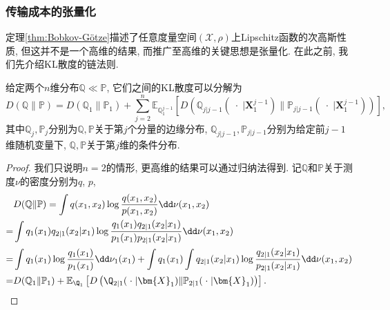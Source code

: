 \subsubsection{传输成本的张量化}
定理\ref{thm:Bobkov-Götze}描述了任意度量空间$(\mathcal{X}, \rho)$上Lipschitz函数的次高斯性质, 但这并不是一个高维的结果, 而推广至高维的关键思想是张量化. 
在此之前, 我们先介绍KL散度的链法则. 
\begin{lemma}\label{lemma:ChainRuleForKLDivergence}
	给定两个$n$维分布$\mathbb{Q} \ll \mathbb{P}$, 它们之间的KL散度可以分解为
	\begin{equation*}
		D(\mathbb{Q} \| \mathbb{P})
		= D(\mathbb{Q}_1 \| \mathbb{P}_1) + \sum_{j=2}^n \mathbb{E}_{\mathbb{Q}_1^{j-1}} \left[ D\left(\mathbb{Q}_{j | j-1}(\;\cdot\; | \bm{X}_1^{j-1}) \big\| \mathbb{P}_{j | j-1}(\;\cdot\; | \bm{X}_1^{j-1})\right) \right], 
	\end{equation*}
	其中$\mathbb{Q}_j, \mathbb{P}_j$分别为$\mathbb{Q}, \mathbb{P}$关于第$j$个分量的边缘分布, $\mathbb{Q}_{j | j-1}, \mathbb{P}_{j | j-1}$分别为给定前$j-1$维随机变量下, $\mathbb{Q}, \mathbb{P}$关于第$j$维的条件分布. 
\end{lemma}
\begin{proof}
	我们只说明$n = 2$的情形, 更高维的结果可以通过归纳法得到. 
	记$\mathbb{Q}$和$\mathbb{P}$关于测度$\nu$的密度分别为$q$, $p$, 
	\begin{align*}
		& D(\mathbb{Q} \| \mathbb{P})
		= \int q(x_1, x_2) \log \frac{q(x_1, x_2)}{p(x_1, x_2)} \dd \nu(x_1, x_2) \\
		=& \int q_1(x_1) q_{2|1}(x_2|x_1) \log \frac{q_1(x_1) q_{2|1}(x_2|x_1)}{p_1(x_1) p_{2|1}(x_2|x_1)} \dd \nu(x_1, x_2) \\
		=& \int q_1(x_1) \log \frac{q_1(x_1)}{p_1(x_1)} \dd \nu_1(x_1) + \int q_1(x_1) \int q_{2|1}(x_2|x_1) \log \frac{q_{2|1}(x_2|x_1)}{p_{2|1}(x_2|x_1)} \dd \nu(x_1, x_2) \\
		=& D(\mathbb{Q}_1 \| \mathbb{P}_1) + \mathbb{E}_{\Q_1} \left[ D\left(\Q_{2|1}(\;\cdot\; | \bm{X}_1) \| \mathbb{P}_{2|1}(\;\cdot\; | \bm{X}_1)\right) \right]. 
	\end{align*}
\end{proof}


